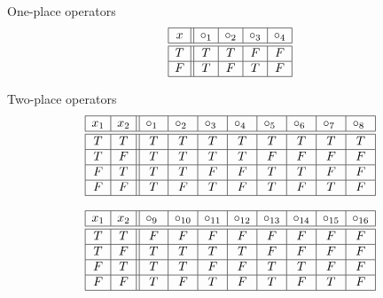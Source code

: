 \documentclass[style=simple,size=12pt]{powerdot}
\begin{document}
\begin{wideslide}[bm=,toc=]{One-place operators}
\begin{displaymath}
\begin{array}{|c||c|c|c|c|}
\hline
x   & \circ_{1}  & \circ_{2}  & \circ_{3}  & \circ_{4} \\ \hline \hline
T & T & T & F & F \\ \hline
F & T & F & T & F \\ \hline
\end{array}
\end{displaymath}
\end{wideslide}

\begin{wideslide}[bm=,toc=]{Two-place operators}
\begin{displaymath}
\begin{array}{|c|c||c|c|c|c|c|c|c|c|}
\hline
x_{1}   & x_{2}   & \circ_{1\ }  & \circ_{2\ }  & \circ_{3\ }  &
\circ_{4\ }  &
\circ_{5\ }  & \circ_{6\ }  &
\circ_{7\ }   & \circ_{8\ } \\ \hline \hline
T & T & T & T & T & T & T & T & T & T \\ \hline
T & F & T & T & T & T & F & F & F & F \\ \hline
F & T & T & T & F & F & T & T & F & F \\ \hline
F & F & T & F & T & F & T & F & T & F \\ \hline
\multicolumn{10}{c}{\ }\\
\hline
x_{1}   & x_{2}   & \circ_{9\ }  & \circ_{10}  & \circ_{11}  & \circ_{12}  &
\circ_{13}  & \circ_{14}  & \circ_{15}   & \circ_{16} \\ \hline\hline
T & T & F & F & F & F & F & F & F & F \\ \hline
T & F & T & T & T & T & F & F & F & F \\ \hline
F & T & T & T & F & F & T & T & F & F \\ \hline
F & F & T & F & T & F & T & F & T & F \\ \hline
\end{array}
\end{displaymath}
\end{wideslide}
\end{document}
